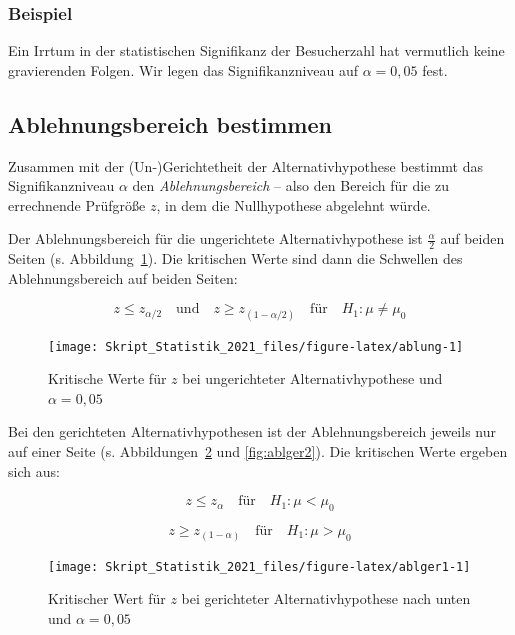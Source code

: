 \documentclass[
  11pt,
  ngerman,
  a4paper,
]{report}
\begin{document}
\hypertarget{beispiel-2}{%
\subsubsection{Beispiel}\label{beispiel-2}}

Ein Irrtum in der statistischen Signifikanz der Besucherzahl hat vermutlich keine gravierenden Folgen. Wir legen das Signifikanzniveau auf \(\alpha=0{,}05\) fest.

\hypertarget{ablehnungsbereich-bestimmen}{%
\subsection{Ablehnungsbereich bestimmen}\label{ablehnungsbereich-bestimmen}}

Zusammen mit der (Un-)Gerichtetheit der Alternativhypothese bestimmt das Signifikanzniveau \(\alpha\) den \emph{Ablehnungsbereich} -- also den Bereich für die zu errechnende Prüfgröße \(z\), in dem die Nullhypothese abgelehnt würde.

Der Ablehnungsbereich für die ungerichtete Alternativhypothese ist \(\frac{\alpha}{2}\) auf beiden Seiten (s. Abbildung~\ref{fig:ablung}). Die kritischen Werte sind dann die Schwellen des Ablehnungsbereich auf beiden Seiten:

\[
z \leq z_{\alpha/2} \quad \textrm{und} \quad z \geq z_{(1-\alpha/2)} \quad \textrm{für} \quad H_1: \mu \neq \mu_0
\label{eq:zkritneq}
\]

\begin{figure}[!h]

{\centering \texttt{[image: Skript\_Statistik\_2021\_files/figure-latex/ablung-1]} 

}

\caption{Kritische Werte für $z$ bei ungerichteter Alternativhypothese und $\alpha=0{,}05$}\label{fig:ablung}
\end{figure}

Bei den gerichteten Alternativhypothesen ist der Ablehnungsbereich jeweils nur auf einer Seite (s. Abbildungen~\ref{fig:ablger1} und \ref{fig:ablger2}). Die kritischen Werte ergeben sich aus:

\[
z \leq z_{\alpha} \quad \textrm{für} \quad H_1: \mu < \mu_0
\label{eq:zkritless}
\]

\[
z \geq z_{(1-\alpha)} \quad \textrm{für} \quad H_1: \mu > \mu_0
\label{eq:zkritgreat}
\]

\begin{figure}[!h]

{\centering \texttt{[image: Skript\_Statistik\_2021\_files/figure-latex/ablger1-1]} 

}

\caption{Kritischer Wert für $z$ bei gerichteter Alternativhypothese nach unten und $\alpha=0{,}05$}\label{fig:ablger1}
\end{figure}
\end{document}
